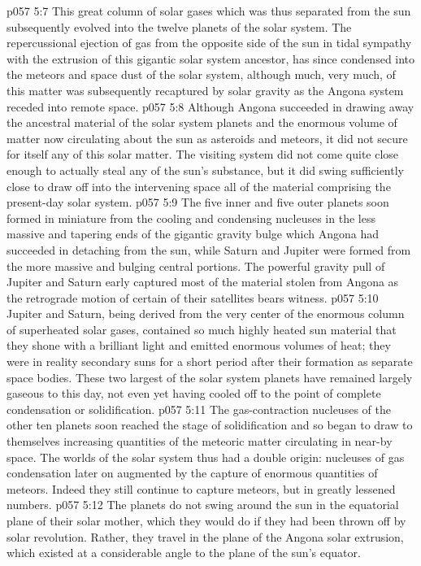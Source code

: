 \vs p057 5:7 This great column of solar gases which was thus separated from the sun subsequently evolved into the twelve planets of the solar system. The repercussional ejection of gas from the opposite side of the sun in tidal sympathy with the extrusion of this gigantic solar system ancestor, has since condensed into the meteors and space dust of the solar system, although much, very much, of this matter was subsequently recaptured by solar gravity as the Angona system receded into remote space.
\vs p057 5:8 Although Angona succeeded in drawing away the ancestral material of the solar system planets and the enormous volume of matter now circulating about the sun as asteroids and meteors, it did not secure for itself any of this solar matter. The visiting system did not come quite close enough to actually steal any of the sun’s substance, but it did swing sufficiently close to draw off into the intervening space all of the material comprising the present\hyp{}day solar system.
\vs p057 5:9 The five inner and five outer planets soon formed in miniature from the cooling and condensing nucleuses in the less massive and tapering ends of the gigantic gravity bulge which Angona had succeeded in detaching from the sun, while Saturn and Jupiter were formed from the more massive and bulging central portions. The powerful gravity pull of Jupiter and Saturn early captured most of the material stolen from Angona as the retrograde motion of certain of their satellites bears witness.
\vs p057 5:10 Jupiter and Saturn, being derived from the very center of the enormous column of superheated solar gases, contained so much highly heated sun material that they shone with a brilliant light and emitted enormous volumes of heat; they were in reality secondary suns for a short period after their formation as separate space bodies. These two largest of the solar system planets have remained largely gaseous to this day, not even yet having cooled off to the point of complete condensation or solidification.
\vs p057 5:11 The gas\hyp{}contraction nucleuses of the other ten planets soon reached the stage of solidification and so began to draw to themselves increasing quantities of the meteoric matter circulating in near\hyp{}by space. The worlds of the solar system thus had a double origin: nucleuses of gas condensation later on augmented by the capture of enormous quantities of meteors. Indeed they still continue to capture meteors, but in greatly lessened numbers.
\vs p057 5:12 The planets do not swing around the sun in the equatorial plane of their solar mother, which they would do if they had been thrown off by solar revolution. Rather, they travel in the plane of the Angona solar extrusion, which existed at a considerable angle to the plane of the sun’s equator.
